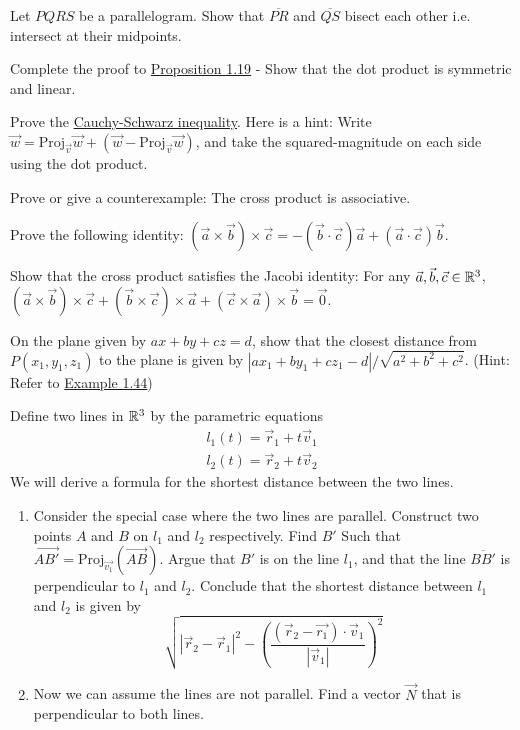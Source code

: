 \begin{exerciselist}
	\item Let $PQRS$ be a parallelogram. Show that $\overline{PR}$ and $\overline{QS}$ bisect each other i.e. intersect at their midpoints. 
	\item Complete the proof to \hyperref[prop:1.19]{Proposition 1.19} - Show that the dot product is symmetric and linear. 
	\item Prove the \hyperref[thm:1.24]{Cauchy-Schwarz inequality}. Here is a hint: Write $\vec{w} =  \textrm{Proj}_{\vec{v}}{\vec{w}} + (\vec{w}-\textrm{Proj}_{\vec{v}}{\vec{w}})$, and take the squared-magnitude on each side using the dot product.
	\item Prove or give a counterexample: The cross product is associative.
	\item Prove the following identity: $(\vec{a}\times\vec{b})\times\vec{c} = -(\vec{b}\cdot\vec{c})\vec{a}+(\vec{a}\cdot\vec{c})\vec{b}$.
	\item Show that the cross product satisfies the Jacobi identity: For any $\vec{a},\vec{b},\vec{c}\in \mathbb{R}^3$, $(\vec{a}\times\vec{b})\times\vec{c} + (\vec{b}\times\vec{c})\times\vec{a} +(\vec{c}\times\vec{a})\times\vec{b} =\vec{0}$.
	\item On the plane given by $ax+by+cz=d$, show that the closest distance from $P(x_1,y_1,z_1)$ to the plane is given by $|ax_1+by_1+cz_1-d|/\sqrt{a^2+b^2+c^2}$. (Hint: Refer to \hyperref[ex:1.44]{Example 1.44})
	\item Define two lines in $\mathbb{R}^3$ by the parametric equations \begin{align*}
		l_1(t) = \vec{r}_1 + t\vec{v}_1\\
		l_2(t)=\vec{r}_2+t\vec{v}_2
	\end{align*}
	We will derive a formula for the shortest distance between the two lines.
	\begin{enumerate}[label=(\alph*)]
		\item Consider the special case where the two lines are parallel. Construct two points $A$ and $B$ on $l_1$ and $l_2$ respectively. Find $B'$ Such that $\overrightarrow{AB'} = \textrm{Proj}_{\vec{v_1}}(\overrightarrow{AB})$. Argue that $B'$ is on the line $l_1$, and that the line $\overline{BB'}$ is perpendicular to $l_1$ and $l_2$. Conclude that the shortest distance between $l_1$ and $l_2$ is given by \[
			\sqrt{|\vec{r}_2-\vec{r}_1|^2 - \left(\frac{(\vec{r}_2-\vec{r_1})\cdot\vec{v}_1}{|\vec{v}_1|}\right)^2}
		\] 
		\item Now we can assume the lines are not parallel. Find a vector $\vec{N}$ that is perpendicular to both lines.

\end{enumerate}
\end{exerciselist}
